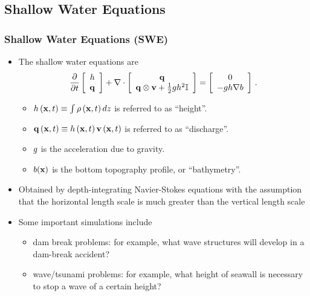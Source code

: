 \subsection{Shallow Water Equations}
\begin{frame}
\frametitle{Shallow Water Equations (SWE)}

\begin{itemize}
  \item The shallow water equations are
    \begin{equation}
      \frac{\partial }{\partial t}\left[\begin{array}{c}h\\\mathbf{q}\end{array}\right]
        + \nabla\cdot\left[\begin{array}{c}\mathbf{q}\\
          \mathbf{q}\otimes\mathbf{v} + \frac{1}{2}gh^2 \mathbb{I}
          \end{array}\right]
        = \left[\begin{array}{c}0\\-gh\nabla b\end{array}
    \right] \,.
    \end{equation}
    \begin{itemize}
      \item $h\left(\mathbf{x},t\right) \equiv \int\rho\left(\mathbf{x},t\right) dz$ is referred to as ``height''.
      \item $\mathbf{q}\left(\mathbf{x},t\right) \equiv h\left(\mathbf{x},t\right)\mathbf{v}\left(\mathbf{x},t\right)$ is referred to
        as ``discharge''.
      \item $g$ is the acceleration due to gravity.
      \item $b(\mathbf{x})$ is the bottom topography profile,
        or ``bathymetry''.
    \end{itemize}
  \item Obtained by depth-integrating Navier-Stokes equations with the
    assumption that the horizontal length scale is much greater than the
    vertical length scale
  \item Some important simulations include
    \begin{itemize}
      \item \textcolor{secondarycolorheavy}{dam break problems}: for example, what wave
        structures will develop in a dam-break accident?
      \item \textcolor{secondarycolorheavy}{wave/tsunami problems}: for example, what height
        of seawall is necessary to stop a wave of a certain height?
    \end{itemize}
\end{itemize}

\end{frame}
